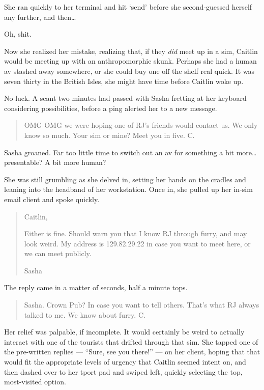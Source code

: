 She ran quickly to her terminal and hit `send' before she second-guessed herself any further, and then\ldots{}

Oh, shit.

Now she realized her mistake, realizing that, if they \emph{did} meet up in a sim, Caitlin would be meeting up with an anthropomorphic skunk. Perhaps she had a human av stashed away somewhere, or she could buy one off the shelf real quick. It was seven thirty in the British Isles, she might have time before Caitlin woke up.

No luck. A scant two minutes had passed with Sasha fretting at her keyboard considering possibilities, before a ping alerted her to a new message.

\begin{quote}
OMG OMG we were hoping one of RJ's friends would contact us. We only know so much. Your sim or mine? Meet you in five. C.
\end{quote}

Sasha groaned. Far too little time to switch out an av for something a bit more\ldots{}presentable? A bit more human?

She was still grumbling as she delved in, setting her hands on the cradles and leaning into the headband of her workstation. Once in, she pulled up her in-sim email client and spoke quickly.

\begin{quote}
Caitlin,

Either is fine. Should warn you that I know RJ through furry, and may look weird. My address is 129.82.29.22 in case you want to meet here, or we can meet publicly.

Sasha
\end{quote}

The reply came in a matter of seconds, half a minute tops.

\begin{quote}
Sasha. Crown Pub? In case you want to tell others. That's what RJ always talked to me. We know about furry. C.
\end{quote}

Her relief was palpable, if incomplete. It would certainly be weird to actually interact with one of the tourists that drifted through that sim. She tapped one of the pre-written replies --- ``Sure, see you there!'' --- on her client, hoping that that would fit the appropriate levels of urgency that Caitlin seemed intent on, and then dashed over to her tport pad and swiped left, quickly selecting the top, most-visited option.

